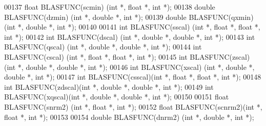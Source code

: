 \begin{DoxyCode}
00137 \textcolor{keywordtype}{float}  BLASFUNC(scmin) (\textcolor{keywordtype}{int} *, \textcolor{keywordtype}{float}  *, \textcolor{keywordtype}{int} *);
00138 \textcolor{keywordtype}{double} BLASFUNC(dzmin) (\textcolor{keywordtype}{int} *, \textcolor{keywordtype}{double} *, \textcolor{keywordtype}{int} *);
00139 \textcolor{keywordtype}{double} BLASFUNC(qxmin) (\textcolor{keywordtype}{int} *, \textcolor{keywordtype}{double} *, \textcolor{keywordtype}{int} *);
00140 
00141 \textcolor{keywordtype}{int}    BLASFUNC(sscal) (\textcolor{keywordtype}{int} *,  \textcolor{keywordtype}{float}  *, \textcolor{keywordtype}{float}  *, \textcolor{keywordtype}{int} *);
00142 \textcolor{keywordtype}{int}    BLASFUNC(dscal) (\textcolor{keywordtype}{int} *,  \textcolor{keywordtype}{double} *, \textcolor{keywordtype}{double} *, \textcolor{keywordtype}{int} *);
00143 \textcolor{keywordtype}{int}    BLASFUNC(qscal) (\textcolor{keywordtype}{int} *,  \textcolor{keywordtype}{double} *, \textcolor{keywordtype}{double} *, \textcolor{keywordtype}{int} *);
00144 \textcolor{keywordtype}{int}    BLASFUNC(cscal) (\textcolor{keywordtype}{int} *,  \textcolor{keywordtype}{float}  *, \textcolor{keywordtype}{float}  *, \textcolor{keywordtype}{int} *);
00145 \textcolor{keywordtype}{int}    BLASFUNC(zscal) (\textcolor{keywordtype}{int} *,  \textcolor{keywordtype}{double} *, \textcolor{keywordtype}{double} *, \textcolor{keywordtype}{int} *);
00146 \textcolor{keywordtype}{int}    BLASFUNC(xscal) (\textcolor{keywordtype}{int} *,  \textcolor{keywordtype}{double} *, \textcolor{keywordtype}{double} *, \textcolor{keywordtype}{int} *);
00147 \textcolor{keywordtype}{int}    BLASFUNC(csscal)(\textcolor{keywordtype}{int} *,  \textcolor{keywordtype}{float}  *, \textcolor{keywordtype}{float}  *, \textcolor{keywordtype}{int} *);
00148 \textcolor{keywordtype}{int}    BLASFUNC(zdscal)(\textcolor{keywordtype}{int} *,  \textcolor{keywordtype}{double} *, \textcolor{keywordtype}{double} *, \textcolor{keywordtype}{int} *);
00149 \textcolor{keywordtype}{int}    BLASFUNC(xqscal)(\textcolor{keywordtype}{int} *,  \textcolor{keywordtype}{double} *, \textcolor{keywordtype}{double} *, \textcolor{keywordtype}{int} *);
00150 
00151 \textcolor{keywordtype}{float}  BLASFUNC(snrm2) (\textcolor{keywordtype}{int} *, \textcolor{keywordtype}{float}  *, \textcolor{keywordtype}{int} *);
00152 \textcolor{keywordtype}{float}  BLASFUNC(scnrm2)(\textcolor{keywordtype}{int} *, \textcolor{keywordtype}{float}  *, \textcolor{keywordtype}{int} *);
00153 
00154 \textcolor{keywordtype}{double} BLASFUNC(dnrm2) (\textcolor{keywordtype}{int} *, \textcolor{keywordtype}{double} *, \textcolor{keywordtype}{int} *);

\end{DoxyCode}
